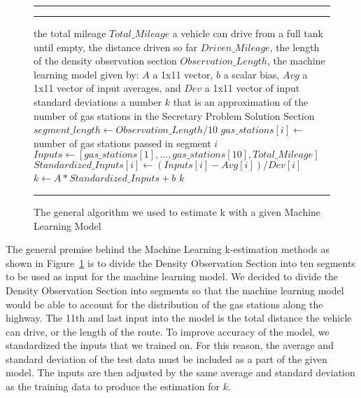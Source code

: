 \begin{figure}[!hbt]
\vspace{0.2cm}
\hrule \medskip {} \smallskip
\hrule
\smallskip
\begin{algorithmic}[1]
 the total mileage $Total\_Mileage$ a vehicle can drive from a full tank until empty, the distance driven so far $Driven\_Mileage$, the length of the density observation section $Observation\_Length$, the machine learning model given by: $A$ a 1x11 vector, $b$ a scalar bias, $Avg$ a 1x11 vector of input averages, and $Dev$ a 1x11 vector of input standard deviations
 a number $k$ that is an approximation of the number of gas stations in the Secretary Problem Solution Section
\STATE $segment\_length \gets Observation\_Length / 10$
\STATE $gas\_stations[i] \gets $ number of gas stations passed in segment $i$
\ENDFOR \\
\STATE $Inputs \gets [gas\_stations[1],\ldots, gas\_stations[10], Total\_Mileage]$
\STATE $Standardized\_Inputs[i] \gets (Inputs[i] - Avg[i]) / Dev[i]$
\ENDFOR
\STATE $k \gets A * Standardized\_Inputs + b$ \label{alg:line:keq}
\RETURN $k$
\end{algorithmic}
\hrule
\caption{The general algorithm we used to estimate k with a given Machine Learning Model}
\label{fig:ml-est}
\end{figure}

The general premise behind the Machine Learning k-estimation methods as shown in Figure~\ref{fig:ml-est} is to divide the Density Observation Section into ten segments to be used as input for the machine learning model. We decided to divide the Density Observation Section into segments so that the machine learning model would be able to account for the distribution of the gas stations along the highway. The 11th and last input into the model is the total distance the vehicle can drive, or the length of the route. To improve accuracy of the model, we standardized the inputs that we trained on. For this reason, the average and standard deviation of the test data must be included as a part of the given model. The inputs are then adjusted by the same average and standard deviation as the training data to produce the estimation for $k$.
